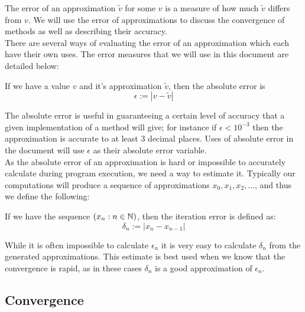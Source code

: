The error of an approximation \(\tilde{v}\) for some \(v\) is a measure of how much \(\tilde{v}\) differs from \(v\). We will use the error of approximations to discuss the convergence of methods as well as describing their accuracy.\\

There are several ways of evaluating the error of an approximation which each have their own uses. The error measures that we will use in this document are detailed below:\\

\begin{Absolute Error}
\label{DEF_"Absolute Error"}
If we have a value \(v\) and it's approximation \(\tilde{v}\), then the absolute error is
\[ \epsilon := \left| v - \tilde{v} \right| \]
\end{Absolute Error}

The absolute error is useful in guaranteeing a certain level of accuracy that a given implementation of a method will give; for instance if \(\epsilon < 10^{-3}\) then the approximation is accurate to at least 3 decimal places. Uses of absolute error in the document will use \(\epsilon\) as their absolute error variable.\\

As the absolute error of an approximation is hard or impossible to accurately calculate during program execution, we need a way to estimate it. Typically our computations will produce a sequence of approximations \(x_0, x_1, x_2, \ldots\), and thus we define the following:

\begin{Iteration Error}
\label{DEF_"Iteration Error"}
If we have the sequence \(\left(x_n : n \in \mathbb{N}\right)\), then the iteration error is defined as:
\[ \delta_n := \left|x_n - x_{n-1}\right| \]
\end{Iteration Error}

While it is often impossible to calculate \(\epsilon_n\) it is very easy to calculate \(\delta_n\) from the generated approximations. This estimate is best used when we know that the convergence is rapid, as in these cases \(\delta_n\) is a good approximation of \(\epsilon_n\).

\subsection{Convergence}
\label{SEC_"Convergence"}

\theoremstyle{definition}
\newtheorem{Uniform Convergence}{Definition}[subsection]
\newtheorem{Rate of Convergence}[Uniform Convergence]{Definition}

